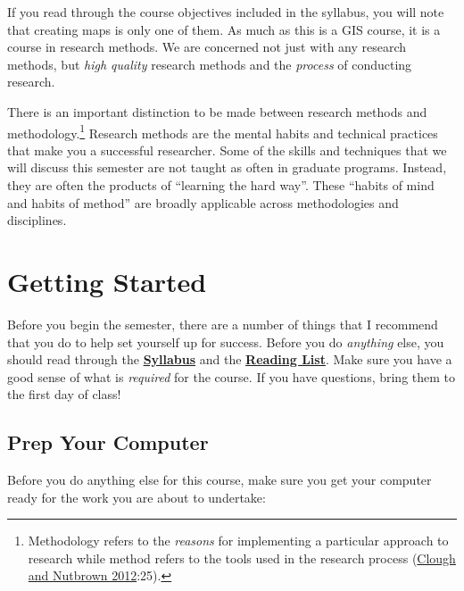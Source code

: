 \documentclass[]{book}
\let\rmarkdownfootnote\footnote%
\def\footnote{\protect\rmarkdownfootnote}
\begin{document}
If you read through the course objectives included in the syllabus, you
will note that creating maps is only one of them. As much as this is a
GIS course, it is a course in research methods. We are concerned not
just with any research methods, but \emph{high quality} research methods
and the \emph{process} of conducting research.

There is an important distinction to be made between research methods
and methodology.\footnote{Methodology refers to the \emph{reasons} for
  implementing a particular approach to research while method refers to
  the tools used in the research process
  (\href{https://books.google.com/books?id=Dq05AwAAQBAJ\&lpg=PA24\&dq=student's\%20guide\%20to\%20methodology\&pg=PP1\#v=onepage\&q\&f=false}{Clough
  and Nutbrown 2012}:25).} Research methods are the mental habits and
technical practices that make you a successful researcher. Some of the
skills and techniques that we will discuss this semester are not taught
as often in graduate programs. Instead, they are often the products of
``learning the hard way''. These ``habits of mind and habits of method''
are broadly applicable across methodologies and disciplines.

\chapter{Getting Started}\label{gettingStarted}

Before you begin the semester, there are a number of things that I
recommend that you do to help set yourself up for success. Before you do
\emph{anything} else, you should read through the
\href{}{\textbf{Syllabus}} and the \href{}{\textbf{Reading List}}. Make
sure you have a good sense of what is \emph{required} for the course. If
you have questions, bring them to the first day of class!

\section{Prep Your Computer}\label{prep-your-computer}

Before you do anything else for this course, make sure you get your
computer ready for the work you are about to undertake:
\end{document}
